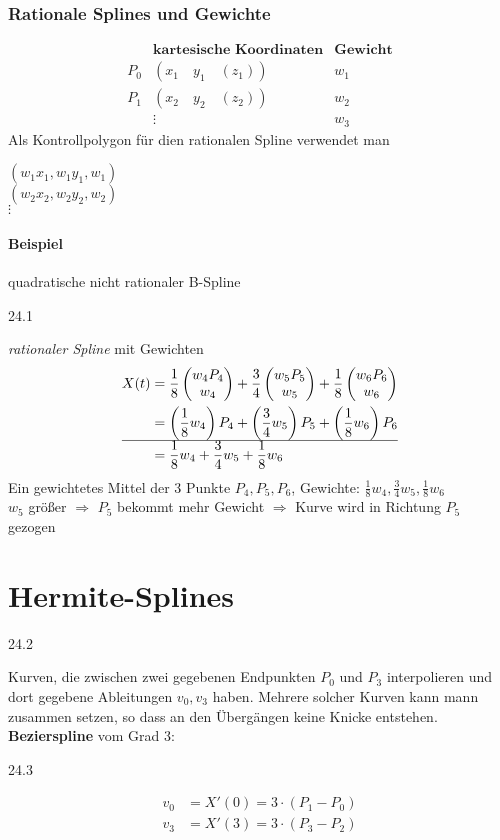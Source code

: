 \subsubsection{Rationale Splines und Gewichte}
\[
 \begin{array}{rr|l}
      & \textbf{kartesische Koordinaten} & \textbf{Gewicht}\\
  \hline
  P_0 & (x_1 \quad y_1 \quad (z_1)) & w_1\\
  P_1 & (x_2 \quad y_2 \quad (z_2)) & w_2\\
	& \vdots & w_3
 \end{array}
\]
Als Kontrollpolygon für dien rationalen Spline verwendet man
\begin{center}
 $(w_1x_1,w_1y_1,w_1)$\\
 $(w_2x_2,w_2y_2,w_2)$\\
 $\vdots$
\end{center}

\paragraph*{Beispiel} quadratische nicht rationaler B-Spline
\begin{center}
24.1
\end{center}
\emph{rationaler Spline} mit Gewichten
\begin{align*}
 X(t) &= \frac{1}{8} \begin{pmatrix}w_4 P_4\\w_4\end{pmatrix} + \frac{3}{4} \begin{pmatrix}w_5 P_5\\w_5\end{pmatrix} + \frac{1}{8} \begin{pmatrix}w_6 P_6\\w_6\end{pmatrix} \\
      &= \left(\frac{1}{8} w_4\right) P_4 + \left(\frac{3}{4} w_5\right) P_5 + \left(\frac{1}{8} w_6\right) P_6\\
      \hline
      &= \frac{1}{8} w_4 + \frac{3}{4} w_5 + \frac{1}{8} w_6
\end{align*}
Ein gewichtetes Mittel der 3 Punkte $P_4, P_5, P_6$, Gewichte: $\frac{1}{8} w_4, \frac{3}{4} w_5, \frac{1}{8} w_6$\\
$w_5$ größer $\Rightarrow$ $P_5$ bekommt mehr Gewicht $\Rightarrow$ Kurve wird in Richtung $P_5$ gezogen

\section{Hermite-Splines}
\begin{center}
 24.2
\end{center}
Kurven, die zwischen zwei gegebenen Endpunkten $P_0$ und $P_3$ interpolieren und dort gegebene Ableitungen $v_0, v_3$
haben. Mehrere solcher Kurven kann mann zusammen setzen, so dass an den Übergängen keine Knicke entstehen.\\[1em]
\textbf{Bezierspline} vom Grad 3:
\begin{center}
 24.3
\end{center}
\begin{align*}
 v_0 &= X'(0) = 3 \cdot (P_1 - P_0)\\
 v_3 &= X'(3) = 3 \cdot (P_3 - P_2)
\end{align*}

